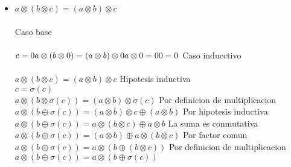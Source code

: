 \documentclass{article}
\begin{document}
\begin{itemize}
        \item{$a \otimes (b \otimes c)=(a\otimes b)\otimes c$}\\
        \\
        Caso base\\
        \\
        \begin{math}
        c=0\\
        a \otimes (b \otimes 0)=(a\otimes b)\otimes 0\\
        a \otimes  0 = 0\\
          0 = 0\\
        \end{math}
         Caso inducctivo\\
         \\
         {$a \otimes (b \otimes c)=(a\otimes b)\otimes c$} Hipotesis inductiva\\
         {$c=\sigma(c)$}\\
         {$a \otimes (b \otimes \sigma(c))=(a\otimes b)\otimes \sigma(c)$} Por definicion de multiplicacion\\
         {$a \otimes(b \oplus \sigma(c))= (a \otimes b)\otimes c \oplus (a \otimes b)$} Por hipotesis inductiva \\
         {$a \otimes(b \oplus \sigma(c))= a \otimes (b\otimes c) \oplus a \otimes b$} La suma es conmutativa\\
         {$a \otimes(b \oplus \sigma(c))= (a \otimes b) \oplus a \otimes (b\otimes c)$} Por factor comun\\
         {$a \otimes(b \oplus \sigma(c))= a \otimes( b \oplus  (b\otimes c))$} Por definicion de multiplicacion\\
         {$a \otimes(b \oplus \sigma(c))= a \otimes(b \oplus \sigma(c))$}\\
         


\end{itemize}
\end{document}
